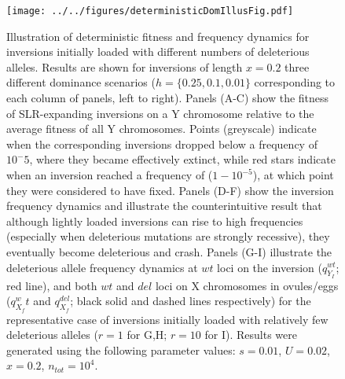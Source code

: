 \documentclass[11pt]{article}
\begin{document}
 \begin{figure}[htbp]\label{fig:determFig}
 \centering
 \texttt{[image: ../../figures/deterministicDomIllusFig.pdf]}
 \caption{\footnotesize{Illustration of deterministic fitness and frequency dynamics for inversions initially loaded with different numbers of deleterious alleles. Results are shown for inversions of length $x = 0.2$ three different dominance scenarios ($h = \{0.25, 0.1, 0.01\}$ corresponding to each column of panels, left to right). Panels (A-C) show the fitness of SLR-expanding inversions on a Y chromosome relative to the average fitness of all Y chromosomes. Points (greyscale) indicate when the corresponding inversions dropped below a frequency of $10^-5$, where they became effectively extinct, while red stars indicate when an inversion reached a frequency of ($1 - 10^{-5}$), at which point they were considered to have fixed. Panels (D-F) show the inversion frequency dynamics and illustrate the counterintuitive result that although lightly loaded inversions can rise to high frequencies (especially when deleterious mutations are strongly recessive), they eventually become deleterious and crash. Panels (G-I) illustrate the deleterious allele frequency dynamics at $wt$ loci on the inversion ($q_{Y_I}^{wt}$; red line), and both $wt$ and $del$ loci on X chromosomes in ovules/eggs ($q_{X_f}^wt$ and $q_{X_f}^{del}$; black solid and dashed lines respectively) for the representative case of inversions initially loaded with relatively few deleterious alleles ($r = 1$ for G,H; $r = 10$ for I). Results were generated using the following parameter values: $s = 0.01$, $U = 0.02$, $x = 0.2$, $n_{tot} = 10^4$.}}
 \end{figure}
\end{document}
